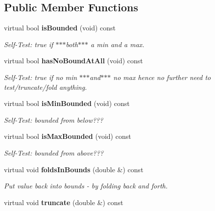 \subsection*{Public Member Functions}
\begin{CompactItemize}
\item 
virtual bool {\bf is\-Bounded} (void) const \label{classeo_real_no_bounds_a1}

\begin{CompactList}\small\item\em Self-Test: true if $\ast$$\ast$$\ast$both$\ast$$\ast$$\ast$ a min and a max. \item\end{CompactList}\item 
virtual bool {\bf has\-No\-Bound\-At\-All} (void) const \label{classeo_real_no_bounds_a2}

\begin{CompactList}\small\item\em Self-Test: true if no min $\ast$$\ast$$\ast$and$\ast$$\ast$$\ast$ no max hence no further need to test/truncate/fold anything. \item\end{CompactList}\item 
virtual bool {\bf is\-Min\-Bounded} (void) const \label{classeo_real_no_bounds_a3}

\begin{CompactList}\small\item\em Self-Test: bounded from below??? \item\end{CompactList}\item 
virtual bool {\bf is\-Max\-Bounded} (void) const \label{classeo_real_no_bounds_a4}

\begin{CompactList}\small\item\em Self-Test: bounded from above??? \item\end{CompactList}\item 
virtual void {\bf folds\-In\-Bounds} (double \&) const \label{classeo_real_no_bounds_a5}

\begin{CompactList}\small\item\em Put value back into bounds - by folding back and forth. \item\end{CompactList}\item 
virtual void {\bf truncate} (double \&) const \label{classeo_real_no_bounds_a6}


\end{CompactItemize}
